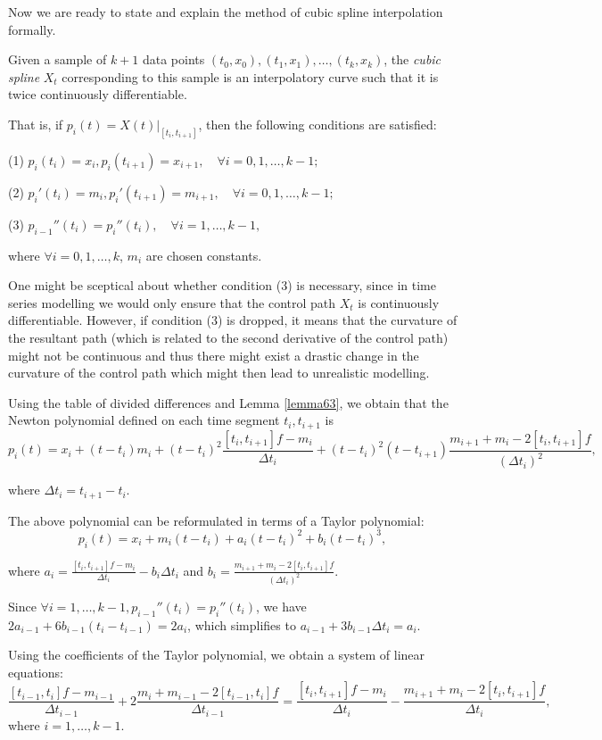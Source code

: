 \documentclass[a4paper,11pt,titlepage]{article}
\theoremstyle{definition}
\theoremstyle{plain}
\theoremstyle{remark}
\begin{document}
Now we are ready to state and explain the method of cubic spline interpolation formally.

 Given a sample of $k+1$ data points
$(t_0,x_0), (t_1,x_1), \dots, (t_k,x_k)$, the \textit{cubic spline} $X_t$ corresponding to this sample is an interpolatory curve such that it is twice continuously differentiable.

That is, if $p_i(t)=X(t)|_{[t_i,t_{i+1}]}$, then the following conditions are satisfied:

(1) $p_i(t_i)=x_i, p_i(t_{i+1})=x_{i+1},\quad\forall i=0,1,\dots,k-1;$

(2) $p_i'(t_i)=m_i, p_i'(t_{i+1})=m_{i+1},\quad\forall i=0,1,\dots,k-1;$

(3) $p_{i-1}''(t_i)=p_i''(t_i),\quad\forall i=1,\dots,k-1,$

where $\forall i=0,1,\dots,k$, $m_i$ are chosen constants.

One might be sceptical about whether condition (3) is necessary, since in time series modelling we would only ensure that the control path $X_t$ is continuously differentiable. However, if condition (3) is dropped, it means that the curvature of the resultant path (which is related to the second derivative of the control path) might not be continuous and thus there might exist a drastic change in the curvature of the control path which might then lead to unrealistic modelling.

Using the table of divided differences and Lemma \ref{lemma63}, we obtain that the Newton polynomial defined on each time segment $t_i,t_{i+1}$ is
$$p_i(t)=x_i+(t-t_i)m_i+(t-t_i)^2\frac{[t_i,t_{i+1}]f-m_i}{\Delta t_i}+(t-t_i)^2(t-t_{i+1})\frac{m_{i+1}+m_i-2[t_i,t_{i+1}]f}{(\Delta t_i)^2},$$

where $\Delta t_i=t_{i+1}-t_i$.

The above polynomial can be reformulated in terms of a Taylor polynomial:
$$p_i(t)=x_i+m_i(t-t_i)+a_i(t-t_i)^2+b_i(t-t_i)^3,$$

where $\displaystyle a_i=\frac{[t_i,t_{i+1}]f-m_i}{\Delta t_i}-b_i\Delta t_i$ and $\displaystyle b_i=\frac{m_{i+1}+m_i-2[t_i,t_{i+1}]f}{(\Delta t_i)^2}$.

Since $\forall i=1,\dots,k-1, p_{i-1}''(t_i)=p_i''(t_i)$, we have $2a_{i-1}+6b_{i-1}(t_i-t_{i-1})=2a_i$, which simplifies to $a_{i-1}+3b_{i-1}\Delta t_i=a_i$.

Using the coefficients of the Taylor polynomial, we obtain a system of linear equations:
$$\frac{[t_{i-1},t_i]f-m_{i-1}}{\Delta t_{i-1}}+2\frac{m_i+m_{i-1}-2[t_{i-1},t_i]f}{\Delta t_{i-1}}=\frac{[t_i,t_{i+1}]f-m_i}{\Delta t_{i}}-\frac{m_{i+1}+m_{i}-2[t_{i},t_{i+1}]f}{\Delta t_{i}},$$
where $i=1,\dots,k-1$.
\end{document}
